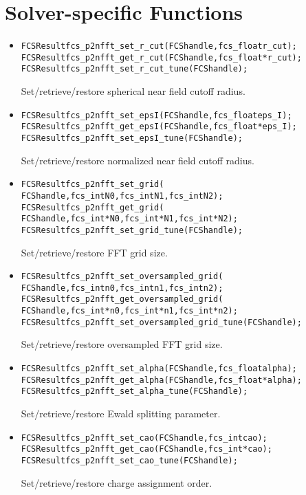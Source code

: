 \section{Solver-specific Functions}
\begin{itemize}
  \item
\begin{alltt}
FCSResult fcs_p2nfft_set_r_cut(FCS handle, fcs_float r_cut);
FCSResult fcs_p2nfft_get_r_cut(FCS handle, fcs_float* r_cut);
FCSResult fcs_p2nfft_set_r_cut_tune(FCS handle);
\end{alltt}
    Set/retrieve/restore spherical near field cutoff radius.
  \item
\begin{alltt}
FCSResult fcs_p2nfft_set_epsI(FCS handle, fcs_float eps_I);
FCSResult fcs_p2nfft_get_epsI(FCS handle, fcs_float* eps_I);
FCSResult fcs_p2nfft_set_epsI_tune(FCS handle);
\end{alltt}
    Set/retrieve/restore normalized near field cutoff radius.
  \item
\begin{alltt}
FCSResult fcs_p2nfft_set_grid(
    FCS handle, fcs_int N0, fcs_int N1, fcs_int N2);
FCSResult fcs_p2nfft_get_grid(
    FCS handle, fcs_int* N0, fcs_int* N1, fcs_int* N2);
FCSResult fcs_p2nfft_set_grid_tune(FCS handle);
\end{alltt}
    Set/retrieve/restore FFT grid size.
  \item
\begin{alltt}
FCSResult fcs_p2nfft_set_oversampled_grid(
    FCS handle, fcs_int n0, fcs_int n1, fcs_int n2);
FCSResult fcs_p2nfft_get_oversampled_grid(
    FCS handle, fcs_int* n0, fcs_int* n1, fcs_int* n2);
FCSResult fcs_p2nfft_set_oversampled_grid_tune(FCS handle);
\end{alltt}
    Set/retrieve/restore oversampled FFT grid size.
  \item
\begin{alltt}
FCSResult fcs_p2nfft_set_alpha(FCS handle, fcs_float alpha);
FCSResult fcs_p2nfft_get_alpha(FCS handle, fcs_float* alpha);
FCSResult fcs_p2nfft_set_alpha_tune(FCS handle);
\end{alltt}
    Set/retrieve/restore Ewald splitting parameter.
  \item
\begin{alltt}
FCSResult fcs_p2nfft_set_cao(FCS handle, fcs_int cao);
FCSResult fcs_p2nfft_get_cao(FCS handle, fcs_int* cao);
FCSResult fcs_p2nfft_set_cao_tune(FCS handle);
\end{alltt}
    Set/retrieve/restore charge assignment order.

\end{itemize}
